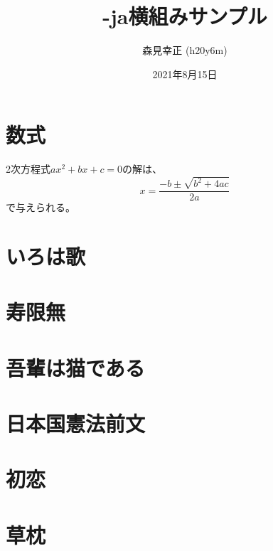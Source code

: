 \documentclass[a4paper,twocolumn]{article}
\title{\XeLaTeX-ja横組みサンプル}
\author{森見幸正 (h20y6m)}
\date{2021年8月15日}
\begin{document}
\maketitle

\section{数式}

2次方程式$ax^2+bx+c=0$の解は、
\[ x = \frac{-b\pm\sqrt{b^2+4ac}}{2a} \]
で与えられる。

\section{いろは歌}

\section{寿限無}

\section{吾輩は猫である}

\section{日本国憲法前文}

\section{初恋}

\section{草枕}
\end{document}
